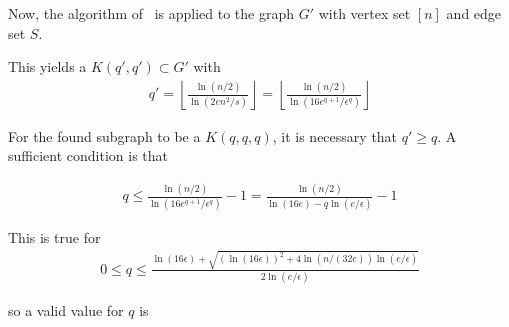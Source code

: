 \documentclass[12pt]{article}
\begin{document}
    Now, the algorithm of~\cite{MUBAYI2010174} is applied to the graph $G'$ with vertex set $[n]$
    and edge set $S$.

    This yields a $K(q', q') \subset G'$ with
    \begin{align*}
        q' = \left \lfloor \frac{\ln(n/2)}{\ln(2en^2/s)} \right \rfloor =
        \left \lfloor \frac{\ln(n/2)}{\ln(16e^{q+1} / \epsilon^q)} \right \rfloor
    \end{align*}

    For the found subgraph to be a $K(q, q, q)$, it is necessary that $q' \geq q$.
    A sufficient condition is that

    \begin{align*}
        q \leq \frac{\ln(n/2)}{\ln(16e^{q+1} / \epsilon^q)} - 1 =
        \frac{\ln(n/2)}{\ln(16e) - q  \ln(e / \epsilon)} - 1
    \end{align*}

    This is true for
    \begin{align*}
        0 \leq q \leq
        \frac
        {\ln(16 \epsilon) + \sqrt {(\ln(16 \epsilon))^2 + 4\ln(n/(32e))\ln(e/ \epsilon)}}
        {2\ln(e / \epsilon)}
    \end{align*}

    so a valid value for $q$ is
    \begin{align*}

    \end{align*}


    
    
\end{document}
